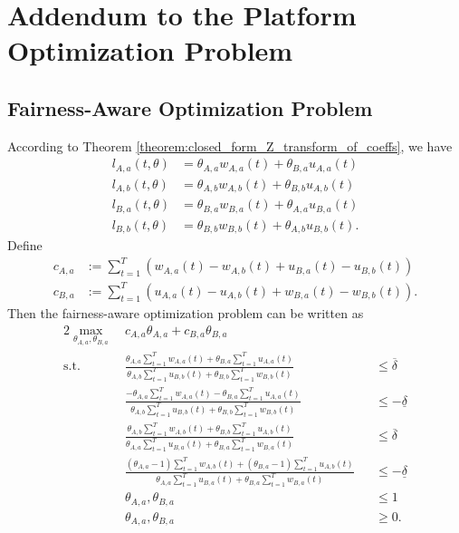 \documentclass[letterpaper]{article} %
\begin{document}
\section{Addendum to the Platform Optimization Problem}\label{sec:addendum_constrained_problem}

\subsection{Fairness-Aware Optimization Problem}\label{sec:addendum_fairness_aware_problem}
According to Theorem \ref{theorem:closed_form_Z_transform_of_coeffs}, we have
\begin{align*}
    l_{A,a}(t,\theta) &= \theta_{A,a} w_{A,a}(t) + \theta_{B,a} u_{A,a}(t) \\
    l_{A,b}(t,\theta) &= \theta_{A,b} w_{A,b}(t) + \theta_{B,b} u_{A,b}(t) \\
    l_{B,a}(t,\theta) &= \theta_{B,a} w_{B,a}(t) + \theta_{A,a} u_{B,a}(t) \\
    l_{B,b}(t,\theta) &= \theta_{B,b} w_{B,b}(t) + \theta_{A,b} u_{B,b}(t).
\end{align*}
Define
\begin{align*}
    c_{A,a} &:= \sum_{t=1}^T (w_{A,a}(t) - w_{A,b}(t) + u_{B,a}(t) - u_{B,b}(t)) \\
    c_{B,a} &:= \sum_{t=1}^T (u_{A,a}(t) - u_{A,b}(t) + w_{B,a}(t) - w_{B,b}(t)).
\end{align*}
Then the fairness-aware optimization problem can be written as
\begin{alignat*}{2}
    \max_{\theta_{A,a}, \theta_{B,a}} \ & c_{A,a} \theta_{A,a} + c_{B,a} \theta_{B,a} && \\
    \text{s.t.} \ & \frac{\theta_{A,a} \sum_{t=1}^T w_{A,a}(t) + \theta_{B,a} \sum_{t=1}^T u_{A,a}(t)}{\theta_{A,b} \sum_{t=1}^T u_{B,b}(t) + \theta_{B,b} \sum_{t=1}^T w_{B,b}(t)} &&\leq \overline{\delta}  \\
    & \frac{-\theta_{A,a} \sum_{t=1}^T w_{A,a}(t) - \theta_{B,a} \sum_{t=1}^T u_{A,a}(t)}{\theta_{A,b} \sum_{t=1}^T u_{B,b}(t) + \theta_{B,b} \sum_{t=1}^T w_{B,b}(t)} &&\leq -\underline{\delta} \\
    & \frac{\theta_{A,b} \sum_{t=1}^T w_{A,b}(t) + \theta_{B,b} \sum_{t=1}^T u_{A,b}(t)}{\theta_{A,a} \sum_{t=1}^T u_{B,a}(t) + \theta_{B,a} \sum_{t=1}^T w_{B,a}(t)} &&\leq \overline{\delta} \\
    & \frac{(\theta_{A,a}-1) \sum_{t=1}^T w_{A,b}(t) + (\theta_{B,a}-1) \sum_{t=1}^T u_{A,b}(t)}{\theta_{A,a} \sum_{t=1}^T u_{B,a}(t) + \theta_{B,a} \sum_{t=1}^T w_{B,a}(t)} &&\leq -\underline{\delta} \\
    &\theta_{A,a}, \theta_{B,a} &&\leq 1 \\
    &\theta_{A,a}, \theta_{B,a} &&\geq 0.
\end{alignat*}
\end{document}
